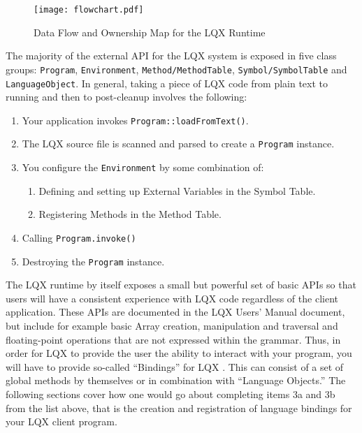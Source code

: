 \documentclass[]{article}
\newcommand{\ModLang}{LQX }
\begin{document}
  \begin{figure}[htbp]
    \centering
      \texttt{[image: flowchart.pdf]}
    \caption{Data Flow and Ownership Map for the LQX Runtime}
    \label{fig:flowchart}
  \end{figure}
  
  The majority of the external API for the \ModLang system is exposed in five class groups:
  {\tt Program}, {\tt Environment}, {\tt Method/MethodTable}, {\tt Symbol/SymbolTable} 
  and {\tt LanguageObject}. In general, taking a piece of \ModLang code from plain text to
  running and then to post-cleanup involves the following:
  
  \begin{enumerate}
    \item Your application invokes {\tt Program::loadFromText()}.
    \item The LQX source file is scanned and parsed to create a {\tt Program} instance.
    \item You configure the {\tt Environment} by some combination of:
      \begin{enumerate}
        \item Defining and setting up External Variables in the Symbol Table.
        \item Registering Methods in the Method Table.
      \end{enumerate}
    \item Calling {\tt Program.invoke()}
    \item Destroying the {\tt Program} instance.
  \end{enumerate}
  
  The LQX runtime by itself exposes a small but powerful set of basic APIs so that users
  will have a consistent experience with \ModLang code regardless of the client application.
  These APIs are documented in the \ModLang Users' Manual document, but include for example
  basic Array creation, manipulation and traversal and floating-point operations that
  are not expressed within the grammar. Thus, in order for \ModLang to provide the user
  the ability to interact with your program, you will have to provide so-called 
  ``Bindings'' for \ModLang. This can consist of a set of global methods by themselves
  or in combination with ``Language Objects.'' The following sections cover how one would
  go about completing items 3a and 3b from the list above, that is the creation and 
  registration of language bindings for your \ModLang client program.
  
\end{document}

